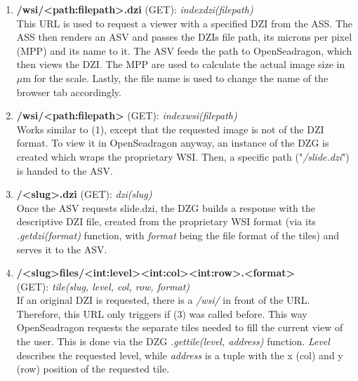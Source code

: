 \begin{enumerate}[(1) -]
	\item\textbf{/wsi/{\textless}path:file{\textunderscore}path{\textgreater}.dzi} (GET): \emph{index{\textunderscore}dzi(file{\textunderscore}path)}\\
	This URL is used to request a viewer with a specified DZI from the ASS. The ASS then renders an ASV and passes the DZIs file path, its microns per pixel (MPP) and its name to it. The ASV feeds the path to OpenSeadragon, which then views the DZI. The MPP are used to calculate the actual image size in $\mu$m for the scale. Lastly, the file name is used to change the name of the browser tab accordingly.
	
	\item \textbf{/wsi/{\textless}path:file{\textunderscore}path{\textgreater}} (GET): \emph{index{\textunderscore}wsi(file{\textunderscore}path)}\\
	Works similar to (1), except that the requested image is not of the DZI format. To view it in OpenSeadragon anyway, an instance of the DZG is created which wraps the proprietary WSI. Then, a specific path ("\emph{/slide.dzi}") is handed to the ASV.
	
	\item \textbf{/{\textless}slug{\textgreater}.dzi} (GET): \emph{dzi(slug)}\\
	Once the ASV requests slide.dzi, the DZG builds a response with the descriptive DZI file, created from the proprietary WSI format (via its \emph{.get{\textunderscore}dzi(format)} function, with \emph{format} being the file format of the tiles) and serves it to the ASV.
	
	\item \textbf{/{\textless}slug{\textgreater}{\textunderscore}files/{\textless}int:level{\textgreater}{\textunderscore}{\textless}int:col{\textgreater}{\textunderscore}{\textless}int:row{\textgreater}.{\textless}format{\textgreater}}\\(GET): \emph{tile(slug, level, col, row, format)}\\
	If an original DZI is requested, there is a \emph{/wsi/} in front of the URL. Therefore, this URL only triggers if (3) was called before. This way OpenSeadragon requests the separate tiles needed to fill the current view of the user. This is done via the DZG \emph{.get{\textunderscore}tile(level, address)} function. \emph{Level} describes the requested level, while \emph{address} is a tuple with the x (col) and y (row) position of the requested tile.
	

\end{enumerate}

